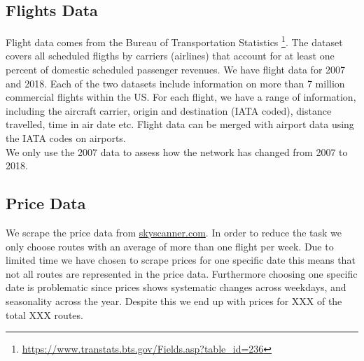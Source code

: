 
\subsection{Flights Data}
\label{subsec:Flight_Data}
Flight data comes from the Bureau of Transportation Statistics \footnote{\url{https://www.transtats.bts.gov/Fields.asp?table_id=236}}. The dataset covers all scheduled fligths by carriers (airlines) that account for at least one percent of domestic scheduled passenger revenues. We have flight data for 2007 and 2018. Each of the two datasets include information on more than 7 million commercial flights within the US. For each flight, we have a range of information, including the aircraft carrier, origin and destination (IATA coded), distance travelled, time in air date etc. Flight data can be merged with airport data using the IATA codes on airports. \medskip\\
We only use the 2007 data to assess how the network has changed from 2007 to 2018. 




\subsection{Price Data}
We scrape the price data from \url{skyscanner.com}. In order to reduce the task we only choose routes with an average of more than one flight per week. Due to limited time we have chosen to scrape prices for one specific date this means that not all routes are represented in the price data. Furthermore choosing one specific date is problematic since prices shows systematic changes across weekdays, and seasonality across the year. Despite this we end up with prices for XXX of the total XXX routes.

